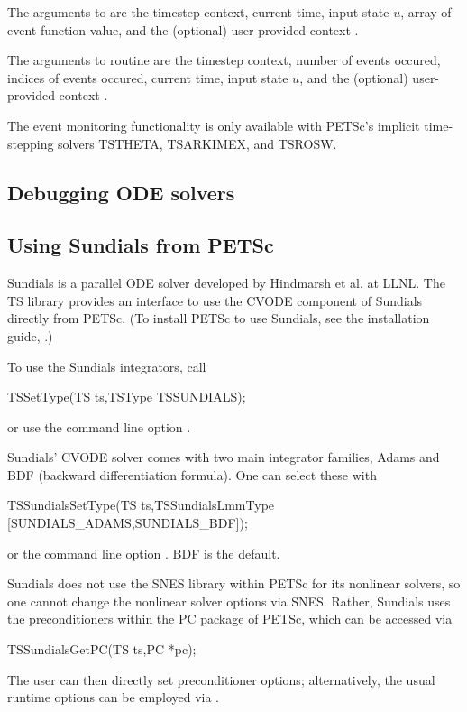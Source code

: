 The arguments to  are the timestep context, current time, input state $u$, array of event function
value, and the (optional) user-provided context . 

The arguments to  routine are
the timestep context, number of events occured, indices of events occured, current time, input state $u$, and the (optional)
user-provided context . 

The event monitoring functionality is only available with PETSc's implicit time-stepping solvers TSTHETA, TSARKIMEX, and TSROSW.

\subsection{Debugging ODE solvers}

\subsection{Using Sundials from PETSc}
\label{sec_sundials}

Sundials is a parallel ODE solver developed by Hindmarsh et al. at LLNL.
The TS library provides an interface to use the CVODE component of
Sundials directly from PETSc.  (To install PETSc to use Sundials, see
the installation guide, .)

To use the Sundials integrators, call
\begin{tabbing}
 TSSetType(TS ts,TSType TSSUNDIALS);
\end{tabbing}
or use the command line option  .
  

Sundials' CVODE solver comes with two main integrator families, Adams
and BDF (backward differentiation formula). One can select these with
\begin{tabbing}
 TSSundialsSetType(TS ts,TSSundialsLmmType [SUNDIALS\_ADAMS,SUNDIALS\_BDF]);
\end{tabbing}
or the command line option . BDF is
the default. 
 

Sundials does not use the SNES library within PETSc for its nonlinear
solvers, so one cannot change the nonlinear solver options via
SNES. Rather, Sundials uses the preconditioners within the PC package
of PETSc, which can be accessed via
\begin{tabbing}
 TSSundialsGetPC(TS ts,PC *pc);
\end{tabbing}
The user can then directly set preconditioner options;
alternatively, the usual runtime options can be employed
via .

